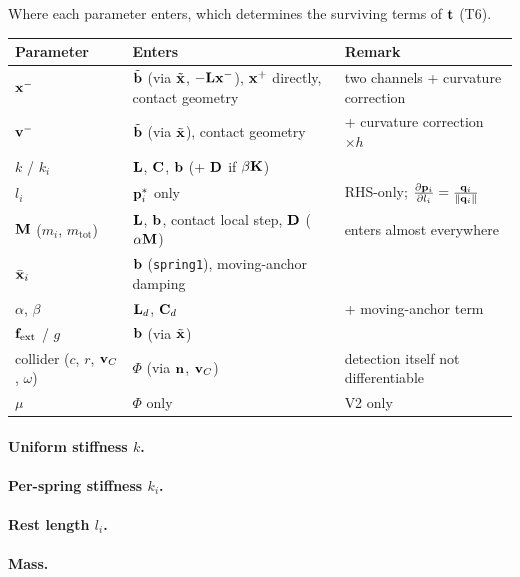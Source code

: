 \noindent Where each parameter enters, which determines the surviving terms of $\mathbf{t}$ (T6).
\begin{center}
\begin{tabular}{lll}
\textbf{Parameter} & \textbf{Enters} & \textbf{Remark} \\ \hline
$\mathbf{x}^-$                      & $\tilde{\mathbf{b}}$ (via $\tilde{\mathbf{x}}$, $-\mathbf{L}\mathbf{x}^-$), $\mathbf{x}^+$ directly, contact geometry & two channels + curvature correction \\
$\mathbf{v}^-$                     & $\tilde{\mathbf{b}}$ (via $\tilde{\mathbf{x}}$), contact geometry & + curvature correction $\times h$ \\
$k$ / $k_i$                 & $\mathbf{L}$, $\mathbf{C}$, $\mathbf{b}$ (+ $\mathbf{D}$ if $\beta\mathbf{K}$) & \\
$l_i$                       & $\mathbf{p}_i^*$ only & RHS-only; $\frac{\partial \mathbf{p}_i}{\partial l_i} = \tfrac{\mathbf{q}_i}{\left\|\mathbf{q}_i\right\|}$ \\
$\mathbf{M}$ ($m_i$, $m_{\text{tot}}$) & $\mathbf{L}$, $\mathbf{b}$, contact local step, $\mathbf{D}$ ($\alpha\mathbf{M}$) & enters almost everywhere \\
$\bar{\mathbf{x}}_i$                  & $\mathbf{b}$ (\texttt{spring1}), moving-anchor damping & \\
$\alpha$, $\beta$           & $\mathbf{L}_d$, $\mathbf{C}_d$ & + moving-anchor term \\
$\mathbf{f}_{\text{ext}}$ / $g$     & $\mathbf{b}$ (via $\tilde{\mathbf{x}}$) & \\
collider ($c$, $r$, $\mathbf{v}_{C}$, $\omega$) & $\Phi$ (via $\mathbf{n}$, $\mathbf{v}_{C}$) & detection itself not differentiable \\
$\mu$                       & $\Phi$ only & V2 only \\
\end{tabular}
\end{center}

\paragraph{Uniform stiffness $k$.} \TODO{}
\paragraph{Per-spring stiffness $k_i$.} \TODO{}
\paragraph{Rest length $l_i$.} \TODO{}
\paragraph{Mass.} \TODO{}
